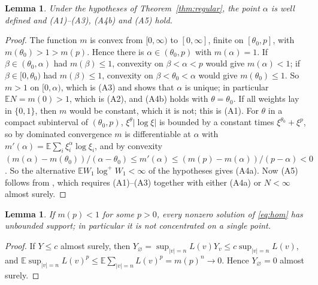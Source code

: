 \documentclass[11pt]{amsart}
\newtheorem{lemma}[theorem]{Lemma}
\theoremstyle{remark}
\newcommand{\E}{\mathbb{E}}
\begin{document}
\begin{lemma}\label{lem:assumptions}
Under the hypotheses of Theorem~\ref{thm:regular}, the point $\alpha$ is well defined and
(A1)--(A3), (A4b) and (A5) hold.
\end{lemma}

\begin{proof}
The function $m$ is convex from $[0,\infty)$ to $[0,\infty]$, finite on $[\theta_0,p]$, with
$m(\theta_0)>1>m(p)$. Hence there is $\alpha\in(\theta_0,p)$ with $m(\alpha)=1$. If
$\beta\in(\theta_0,\alpha)$ had $m(\beta)\le1$, convexity on $\beta<\alpha<p$ would give
$m(\alpha)<1$; if $\beta\in[0,\theta_0)$ had $m(\beta)\le 1$, convexity on
$\beta<\theta_0<\alpha$ would give $m(\theta_0)\le1$. So $m>1$ on $[0,\alpha)$, which is
(A3) and shows that $\alpha$ is unique; in particular $\E N=m(0)>1$, which is (A2), and
(A4b) holds with $\theta=\theta_0$. If all weights lay in $\{0,1\}$, then $m$ would be
constant, which it is not; this is (A1). For $\theta$ in a compact subinterval of
$(\theta_0,p)$, $\xi^\theta|\log\xi|$ is bounded by a constant times
$\xi^{\theta_0}+\xi^{p}$, so by dominated convergence $m$ is differentiable at $\alpha$
with $m'(\alpha)=\E\sum_i\xi_i^\alpha\log\xi_i$, and by
convexity $(m(\alpha)-m(\theta_0))/(\alpha-\theta_0)\le m'(\alpha)\le
(m(p)-m(\alpha))/(p-\alpha)<0$. So the alternative $\E W_1\log^+W_1<\infty$ of the
hypotheses gives (A4a). Now (A5) follows from \cite[Proposition~2.1]{ABM}, which requires
(A1)--(A3) together with either (A4a) or $N<\infty$ almost surely.
\end{proof}

\begin{lemma}\label{lem:unbounded}
If $m(p)<1$ for some $p>0$, every nonzero solution of \eqref{eq:hom} has unbounded
support; in particular it is not concentrated on a single point.
\end{lemma}

\begin{proof}
If $Y\le c$ almost surely, then $Y_\varnothing=\sup_{|v|=n}L(v)Y_v\le c\sup_{|v|=n}L(v)$,
and $\E\sup_{|v|=n}L(v)^p\le\E\sum_{|v|=n}L(v)^p=m(p)^n\to0$. Hence $Y_\varnothing=0$
almost surely.
\end{proof}
\end{document}
